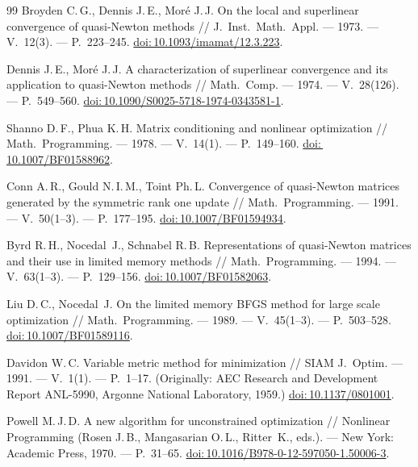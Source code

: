 \begin{thebibliography}{99}
  Broyden C.\,G., Dennis J.\,E., Mor{\'e} J.\,J.
  On the local and superlinear convergence of quasi-Newton methods //
  J.~Inst.~Math.~Appl. --- 1973. --- V.~12(3). --- P.~223--245.
  \href{https://doi.org/10.1093/imamat/12.3.223}{doi:\,10.1093/imamat/12.3.223}.

  Dennis J.\,E., Mor{\'e} J.\,J.
  A characterization of superlinear convergence and its application
  to quasi-Newton methods //
  Math.~Comp. --- 1974. --- V.~28(126). --- P.~549--560.
  \href{https://doi.org/10.1090/S0025-5718-1974-0343581-1}{doi:\,10.1090/S0025-5718-1974-0343581-1}.

  Shanno D.\,F., Phua K.\,H.
  Matrix conditioning and nonlinear optimization //
  Math.~Programming. --- 1978. --- V.~14(1). --- P.~149--160.
  \href{https://doi.org/10.1007/BF01588962}{doi:\,10.1007/BF01588962}.

  Conn A.\,R., Gould N.\,I.\,M., Toint Ph.\,L.
  Convergence of quasi-Newton matrices generated by the symmetric
  rank one update //
  Math.~Programming. --- 1991. --- V.~50(1--3). --- P.~177--195.
  \href{https://doi.org/10.1007/BF01594934}{doi:\,10.1007/BF01594934}.

  Byrd R.\,H., Nocedal~J., Schnabel R.\,B.
  Representations of quasi-Newton matrices and their use in limited
  memory methods //
  Math.~Programming. --- 1994. --- V.~63(1--3). --- P.~129--156.
  \href{https://doi.org/10.1007/BF01582063}{doi:\,10.1007/BF01582063}.

  Liu D.\,C., Nocedal~J. On the limited memory BFGS method for large
  scale optimization //
  Math.~Programming. --- 1989. --- V.~45(1--3). --- P.~503--528.
  \href{https://doi.org/10.1007/BF01589116}{doi:\,10.1007/BF01589116}.

  Davidon W.\,C. Variable metric method for minimization //
  SIAM J.~Optim. --- 1991. --- V.~1(1). --- P.~1--17.
  (Originally: AEC Research and Development Report ANL-5990, Argonne
  National Laboratory, 1959.)
  \href{https://doi.org/10.1137/0801001}{doi:\,10.1137/0801001}.

  Powell M.\,J.\,D. A new algorithm for unconstrained optimization //
  Nonlinear Programming (Rosen J.\,B., Mangasarian O.\,L., Ritter~K., eds.). ---
  New York: Academic Press, 1970. --- P.~31--65.
  \href{https://doi.org/10.1016/B978-0-12-597050-1.50006-3}{doi:\,10.1016/B978-0-12-597050-1.50006-3}.


\end{thebibliography}
